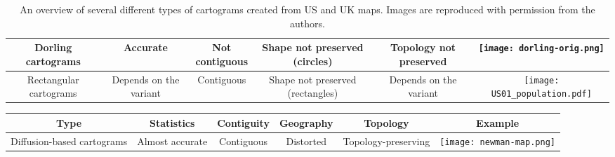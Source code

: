 \documentclass{egpubl}
\begin{document}
{\begin{table*}[htbp]
\begin{tabular}{|c|c|c|c|c|c|}
\parbox{0.135\textwidth}{\hspace{-0.1cm}\parbox{0.145\textwidth}{\centering Dorling cartograms \cite{dorling96}
}} &
	\parbox{0.08\textwidth}{\centering Accurate} &
	\parbox{0.088\textwidth}{\centering Not\\contiguous} &
	\parbox{0.1\textwidth}{\centering  Shape not preserved (circles)} &
	\parbox{0.155\textwidth}{\centering Topology not preserved} &
\parbox{0.19\textwidth}{\vspace{0.1cm}\texttt{[image: dorling-orig.png]}}\\

\hline

\parbox{0.135\textwidth}{\centering Rectangular cartograms \cite{BSV12} } &
	\parbox{0.08\textwidth}{\centering Depends on the variant} &
	\parbox{0.088\textwidth}{\centering Contiguous} &
	\parbox{0.1\textwidth}{\centering Shape not preserved (rectangles)} &
	\parbox{0.155\textwidth}{\centering Depends on the variant} &
\parbox{0.18\textwidth}{\vspace{0.2cm}\texttt{[image: US01\_population.pdf]} \vspace{.1cm}}\\

\hline


\end{tabular}
\caption{
An overview of
several different types of cartograms created from US and UK maps.
Images are reproduced with permission from the authors.
}
\label{table:all-algorithms}
\setcounter{dummy}{\value{table}}
\end{table*}


\begin{table*}[htbp]
\centering
\begin{tabular}{|c|c|c|c|c|c|}
\hline

\parbox{0.135\textwidth}{\centering \textbf{Type}} &
	\parbox{0.08\textwidth}{\centering \textbf{Statistics}} &
	\parbox{0.088\textwidth}{\centering \textbf{Contiguity}} &
	\parbox{0.1\textwidth}{\centering \textbf{Geography}} &
	\parbox{0.155\textwidth}{\centering \textbf{Topology}} &
\parbox{0.28\textwidth}{\centering \textbf{Example}}\\

\hline 


\parbox{0.135\textwidth}{\centering Diffusion-based cartograms \cite{GN04}
} &
	\parbox{0.08\textwidth}{\centering Almost accurate} &
	\parbox{0.088\textwidth}{\centering Contiguous} &
	\parbox{0.1\textwidth}{\centering  Distorted} &
	\parbox{0.155\textwidth}{\centering Topology-preserving} &
\parbox{0.19\textwidth}{\vspace{0.1cm}\texttt{[image: newman-map.png]}}\\


\end{tabular}
\end{table*}}
\end{document}
